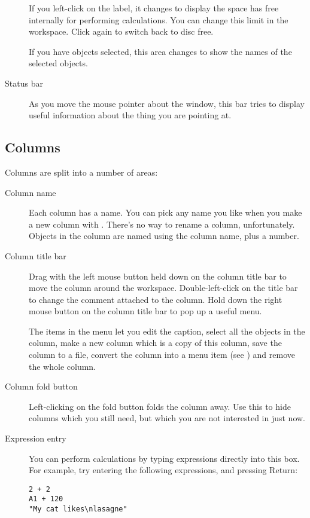 \begin{description}
If you left-click on the label, it changes to display the space \nip{} has
free internally for performing calculations. You can change this limit in the
 workspace. Click again to switch back to disc free.

If you have objects selected, this area changes to show the
names of the selected objects.

\item[Status bar]
As you move the mouse pointer about the window, this bar tries to display
useful information about the thing you are pointing at. 

\end{description}

\subsection{Columns}

Columns are split into a number of areas:

\begin{description}

\item[Column name]
Each column has a name. You can pick any name you like when you make a new
column with . There's no way to rename a column,
unfortunately. Objects in the column are named using the column name,
plus a number.

\item[Column title bar]
Drag with the left mouse button held down on the column title bar to move
the column around the workspace. Double-left-click on the title bar to
change the comment attached to the column. Hold down the right mouse button
on the column title bar to pop up a useful menu. 

The items in the menu let you edit the caption, select all the objects
in the column, make a new column which is a copy of this column, save the
column to a file, convert the column into a menu item
(see ) and remove the whole column.

\item[Column fold button]
Left-clicking on the fold button folds the column away. Use this to hide
columns which you still need, but which you are not interested in just now.

\item[Expression entry]
You can perform calculations by typing expressions directly into this box. For
example, try entering the following expressions, and pressing Return:

\begin{verbatim}
2 + 2
A1 + 120
"My cat likes\nlasagne"
\end{verbatim}

\end{description}

